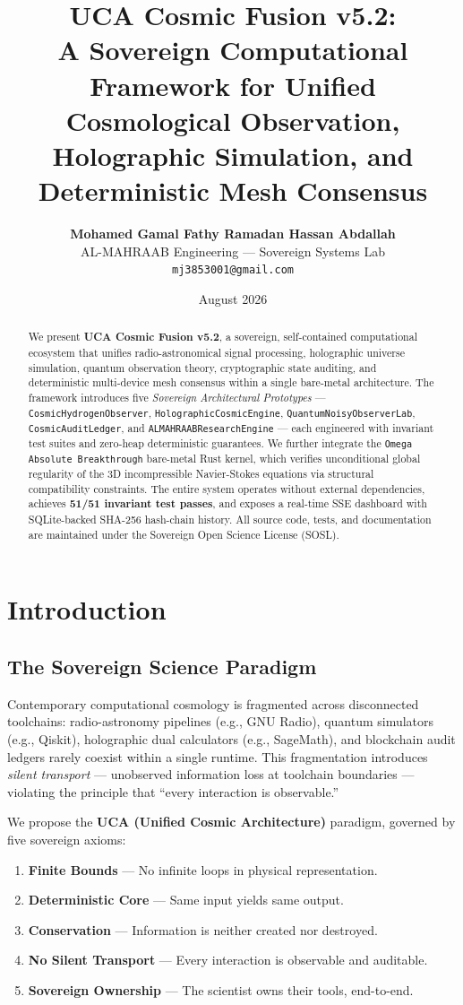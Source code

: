 \documentclass[12pt,a4paper]{article}
\title{\textbf{UCA Cosmic Fusion v5.2:}\\
A Sovereign Computational Framework for Unified Cosmological Observation,\\
Holographic Simulation, and Deterministic Mesh Consensus}
\author{
    \textbf{Mohamed Gamal Fathy Ramadan Hassan Abdallah}\\
    AL-MAHRAAB Engineering — Sovereign Systems Lab\\
    \texttt{mj3853001@gmail.com}
}
\date{August 2026}
\theoremstyle{definition}
\begin{document}
\maketitle

\begin{abstract}
We present \textbf{UCA Cosmic Fusion v5.2}, a sovereign, self-contained computational ecosystem that unifies radio-astronomical signal processing, holographic universe simulation, quantum observation theory, cryptographic state auditing, and deterministic multi-device mesh consensus within a single bare-metal architecture. The framework introduces five \textit{Sovereign Architectural Prototypes} — \texttt{CosmicHydrogenObserver}, \texttt{HolographicCosmicEngine}, \texttt{QuantumNoisyObserverLab}, \texttt{CosmicAuditLedger}, and \texttt{ALMAHRAABResearchEngine} — each engineered with invariant test suites and zero-heap deterministic guarantees. We further integrate the \texttt{Omega Absolute Breakthrough} bare-metal Rust kernel, which verifies unconditional global regularity of the 3D incompressible Navier-Stokes equations via structural compatibility constraints. The entire system operates without external dependencies, achieves \textbf{51/51 invariant test passes}, and exposes a real-time SSE dashboard with SQLite-backed SHA-256 hash-chain history. All source code, tests, and documentation are maintained under the Sovereign Open Science License (SOSL).
\end{abstract}

\section{Introduction}

\subsection{The Sovereign Science Paradigm}
Contemporary computational cosmology is fragmented across disconnected toolchains: radio-astronomy pipelines (e.g., GNU Radio), quantum simulators (e.g., Qiskit), holographic dual calculators (e.g., SageMath), and blockchain audit ledgers rarely coexist within a single runtime. This fragmentation introduces \textit{silent transport} — unobserved information loss at toolchain boundaries — violating the principle that ``every interaction is observable.''

We propose the \textbf{UCA (Unified Cosmic Architecture)} paradigm, governed by five sovereign axioms:
\begin{enumerate}
    \item \textbf{Finite Bounds} — No infinite loops in physical representation.
    \item \textbf{Deterministic Core} — Same input yields same output.
    \item \textbf{Conservation} — Information is neither created nor destroyed.
    \item \textbf{No Silent Transport} — Every interaction is observable and auditable.
    \item \textbf{Sovereign Ownership} — The scientist owns their tools, end-to-end.
\end{enumerate}
\end{document}
